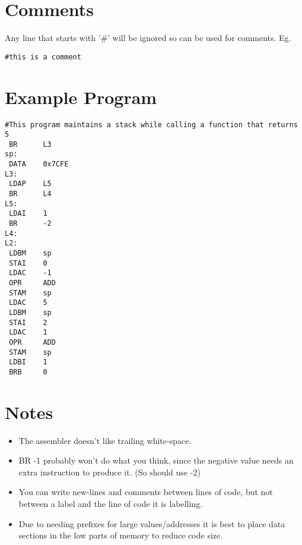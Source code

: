 \documentclass[10pt,a4paper]{article}
\begin{document}
\section{Comments}
Any line that starts with '\#' will be ignored so can be used for comments.
\break Eg.
\begin{lstlisting}[frame=single]
#this is a comment
\end{lstlisting}

\section{Example Program}
\begin{lstlisting}[frame=single]
#This program maintains a stack while calling a function that returns 5
 BR      L3
sp:
 DATA    0x7CFE
L3:
 LDAP    L5
 BR      L4
L5:
 LDAI    1
 BR      -2
L4:
L2:
 LDBM    sp
 STAI    0
 LDAC    -1
 OPR     ADD
 STAM    sp
 LDAC    5
 LDBM    sp
 STAI    2
 LDAC    1
 OPR     ADD
 STAM    sp
 LDBI    1
 BRB     0
\end{lstlisting}

\section{Notes}

\begin{itemize}
  \item The assembler doesn't like trailing white-space.
  \item BR -1 probably won't do what you think, since the negative value needs an extra instruction to produce it. (So should use -2)
  \item You can write new-lines and comments between lines of code, but not between a label and the line of code it is labelling.
  \item Due to needing prefixes for large values/addresses it is best to place data sections in the low parts of memory to reduce code size.
\end{itemize}
\end{document}

